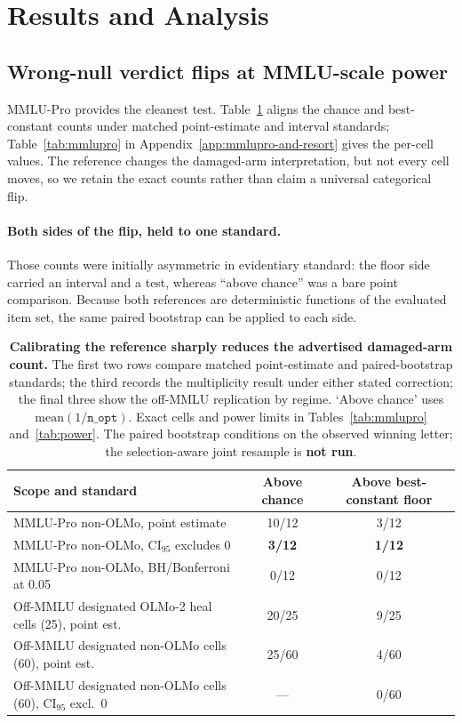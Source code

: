 \section{Results and Analysis}

\subsection{Wrong-null verdict flips at MMLU-scale power}
\label{sec:flips}

MMLU-Pro provides the cleanest test. Table~\ref{tab:headline-reference} aligns the chance and best-constant counts under matched point-estimate and interval standards; Table~\ref{tab:mmlupro} in Appendix~\ref{app:mmlupro-and-resort} gives the per-cell values. The reference changes the damaged-arm interpretation, but not every cell moves, so we retain the exact counts rather than claim a universal categorical flip.

\paragraph{Both sides of the flip, held to one standard.}
Those counts were initially asymmetric in evidentiary standard: the floor side carried an interval and a test, whereas ``above chance'' was a bare point comparison. Because both references are deterministic functions of the evaluated item set, the same paired bootstrap can be applied to each side.

\begin{table}[!htbp]
\centering
\scriptsize
\setlength{\tabcolsep}{3pt}
\begin{tabular}{@{}lcc@{}}
\toprule
Scope and standard & Above chance & Above best-constant floor \\
\midrule
MMLU-Pro non-OLMo, point estimate & 10/12 & 3/12 \\
MMLU-Pro non-OLMo, CI$_{95}$ excludes 0 & \textbf{3/12} & \textbf{1/12} \\
MMLU-Pro non-OLMo, BH/Bonferroni at 0.05 & 0/12 & 0/12 \\
Off-MMLU designated OLMo-2 heal cells (25), point est. & 20/25 & 9/25 \\
Off-MMLU designated non-OLMo cells (60), point est. & 25/60 & 4/60 \\
Off-MMLU designated non-OLMo cells (60), CI$_{95}$ excl.\ 0 & --- & 0/60 \\
\bottomrule
\end{tabular}
\caption{\textbf{Calibrating the reference sharply reduces the advertised damaged-arm count.}
The first two rows compare matched point-estimate and paired-bootstrap standards; the third records the
multiplicity result under either stated correction; the final three show
the off-MMLU replication by regime. `Above chance' uses $\mathrm{mean}(1/\texttt{n\_opt})$.
Exact cells and power limits in Tables~\ref{tab:mmlupro} and~\ref{tab:power}. The paired bootstrap
conditions on the observed winning letter; the selection-aware joint resample is \textbf{not run}.}
\label{tab:headline-reference}
\end{table}

